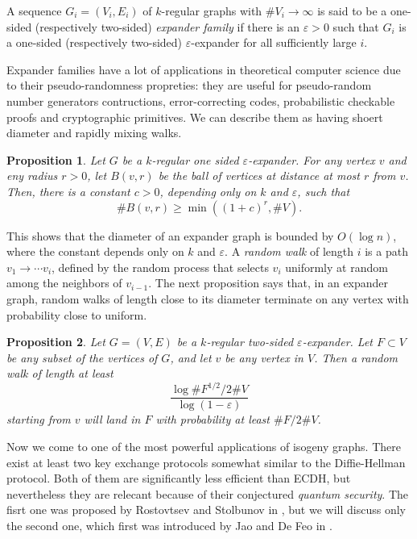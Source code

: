 \documentclass{article}
\theoremstyle{theorem}
\newtheorem{proposition}{Proposition}
\theoremstyle{definition}
\begin{document}
A sequence $G_i = (V_i, E_i)$ of $k$-regular graphs with $\#V_i \to \infty$ is said to be a one-sided (respectively two-sided) \textit{expander family} if there is an $\varepsilon > 0$ such that $G_i$ is a one-sided (respectively two-sided) $\varepsilon$-expander for all sufficiently large $i$.

Expander families have a lot of applications in theoretical computer science due to their pseudo-randomness propreties: they are useful for pseudo-random number generators contructions, error-correcting codes, probabilistic checkable proofs and cryptographic primitives. We can describe them as having shoert diameter and rapidly mixing walks.

\begin{proposition}
	Let $G$ be a $k$-regular one sided $\varepsilon$-expander. For any vertex $v$ and eny radius $r > 0$, let $B(v, r)$ be the ball of vertices at distance at most $r$ from $v$. Then, there is a constant $c > 0$, depending  only on $k$ and $\varepsilon$, such that
		\[ \#B(v, r) \geq\min((1 + c)^r, \#V). \]
\end{proposition}

This shows that the diameter of an expander graph is bounded by $O(\log n)$, where the constant depends only on $k$ and $\varepsilon$. A \textit{random walk} of length $i$ is a path $v_1 \to \cdots v_i$, defined by the random process that selects $v_i$ uniformly at random among the neighbors of $v_{i-1}$. The next proposition says that, in an expander graph, random walks of length close to its diameter terminate on any vertex with probability close to uniform.

\begin{proposition}
	Let $G = (V, E)$ be a $k$-regular two-sided $\varepsilon$-expander. Let $F \subset V$ be any subset of the vertices of $G$, and let $v$ be any vertex in $V$. Then a random walk of length at least
		\[ \frac{\log\#F^{1/2}/2\#V}{\log(1 - \varepsilon)} \]
	starting from $v$ will land in $F$ with probability at least $\#F/2\#V$.
\end{proposition}

Now we come to one of the most powerful applications of isogeny graphs. There exist at least two key exchange protocols somewhat similar to the Diffie-Hellman protocol. Both of them are significantly less efficient than ECDH, but nevertheless they are relecant because of their conjectured \textit{quantum security}. %
The fisrt one was proposed by Rostovtsev and Stolbunov in  \cite{RostovstsevStolbunov}, but we will discuss only the second one, which first was introduced by Jao and De Feo in \cite{TowardsQuantumRes}.
\end{document}
